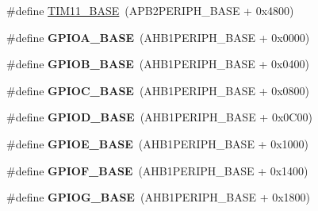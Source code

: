 \begin{DoxyCompactItemize}
\item 
\#define \hyperlink{group___peripheral__memory__map_ga3a4a06bb84c703084f0509e105ffaf1d}{T\+I\+M11\+\_\+\+B\+A\+SE}~(A\+P\+B2\+P\+E\+R\+I\+P\+H\+\_\+\+B\+A\+SE + 0x4800)
\item 
\#define {\bfseries G\+P\+I\+O\+A\+\_\+\+B\+A\+SE}~(A\+H\+B1\+P\+E\+R\+I\+P\+H\+\_\+\+B\+A\+SE + 0x0000)\hypertarget{group___peripheral__memory__map_gad7723846cc5db8e43a44d78cf21f6efa}{}\label{group___peripheral__memory__map_gad7723846cc5db8e43a44d78cf21f6efa}

\item 
\#define {\bfseries G\+P\+I\+O\+B\+\_\+\+B\+A\+SE}~(A\+H\+B1\+P\+E\+R\+I\+P\+H\+\_\+\+B\+A\+SE + 0x0400)\hypertarget{group___peripheral__memory__map_gac944a89eb789000ece920c0f89cb6a68}{}\label{group___peripheral__memory__map_gac944a89eb789000ece920c0f89cb6a68}

\item 
\#define {\bfseries G\+P\+I\+O\+C\+\_\+\+B\+A\+SE}~(A\+H\+B1\+P\+E\+R\+I\+P\+H\+\_\+\+B\+A\+SE + 0x0800)\hypertarget{group___peripheral__memory__map_ga26f267dc35338eef219544c51f1e6b3f}{}\label{group___peripheral__memory__map_ga26f267dc35338eef219544c51f1e6b3f}

\item 
\#define {\bfseries G\+P\+I\+O\+D\+\_\+\+B\+A\+SE}~(A\+H\+B1\+P\+E\+R\+I\+P\+H\+\_\+\+B\+A\+SE + 0x0\+C00)\hypertarget{group___peripheral__memory__map_ga1a93ab27129f04064089616910c296ec}{}\label{group___peripheral__memory__map_ga1a93ab27129f04064089616910c296ec}

\item 
\#define {\bfseries G\+P\+I\+O\+E\+\_\+\+B\+A\+SE}~(A\+H\+B1\+P\+E\+R\+I\+P\+H\+\_\+\+B\+A\+SE + 0x1000)\hypertarget{group___peripheral__memory__map_gab487b1983d936c4fee3e9e88b95aad9d}{}\label{group___peripheral__memory__map_gab487b1983d936c4fee3e9e88b95aad9d}

\item 
\#define {\bfseries G\+P\+I\+O\+F\+\_\+\+B\+A\+SE}~(A\+H\+B1\+P\+E\+R\+I\+P\+H\+\_\+\+B\+A\+SE + 0x1400)\hypertarget{group___peripheral__memory__map_ga7f9a3f4223a1a784af464a114978d26e}{}\label{group___peripheral__memory__map_ga7f9a3f4223a1a784af464a114978d26e}

\item 
\#define {\bfseries G\+P\+I\+O\+G\+\_\+\+B\+A\+SE}~(A\+H\+B1\+P\+E\+R\+I\+P\+H\+\_\+\+B\+A\+SE + 0x1800)\hypertarget{group___peripheral__memory__map_ga5d8ca4020f2e8c00bde974e8e7c13cfe}{}\label{group___peripheral__memory__map_ga5d8ca4020f2e8c00bde974e8e7c13cfe}


\end{DoxyCompactItemize}
